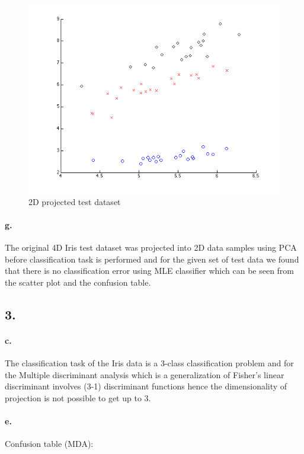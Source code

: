 \documentclass[a4paper]{article}
\begin{document}
\begin{figure}[H]
  \centering
    \includegraphics[scale=.47]{images/2_f.png}
  \caption{2D projected test dataset}
\end{figure}
\paragraph{g.} The original 4D Iris test dataset was projected into 2D data samples using PCA before classification task is performed and for the given set of test data we found that there is no classification error using MLE classifier which can be seen from the scatter plot and the confusion table.\\

\subsection*{3.}
\paragraph{c.} The classification task of the Iris data is a 3-class classification problem and for the Multiple discriminant analysis which is a generalization of Fisher's linear discriminant involves (3-1) discriminant functions hence the dimensionality of projection is not possible to get up to 3. \\
\paragraph{e.} Confusion table (MDA): \\
\end{document}
